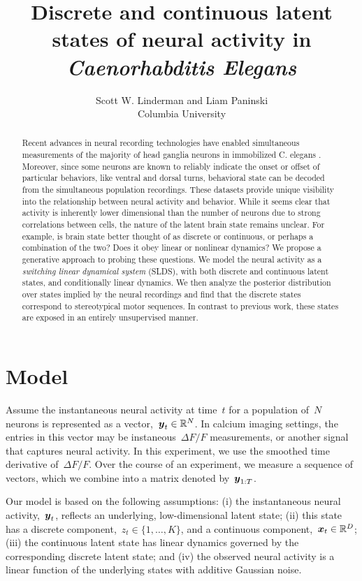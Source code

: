 \documentclass{article}
\title{Discrete and continuous latent states of neural activity in \textit{Caenorhabditis Elegans}}
\author{Scott W. Linderman 
  and
  Liam Paninski \\
  Columbia University
}
\begin{document}
\singlespacing
\maketitle

\begin{abstract}
  Recent advances in neural recording technologies have enabled
  simultaneous measurements of the majority of head ganglia neurons in
  immobilized C. elegans \cite{kato2015global}. Moreover, since some
  neurons are known to reliably indicate the onset or offset of
  particular behaviors, like ventral and dorsal turns, behavioral
  state can be decoded from the simultaneous population recordings.
  These datasets provide unique visibility into the relationship
  between neural activity and behavior.  While it seems clear that
  activity is inherently lower dimensional than the number of neurons
  due to strong correlations between cells, the nature of the latent brain state
  remains unclear. For example, is brain state better thought of as
  discrete or continuous, or perhaps a combination of the two? Does it
  obey linear or nonlinear dynamics?  We propose a generative approach
  to probing these questions. We model the neural activity as a
  \emph{switching linear dynamical system} (SLDS), with both discrete
  and continuous latent states, and conditionally linear dynamics.  We
  then analyze the posterior distribution over states implied by the
  neural recordings and find that the discrete states correspond to
  stereotypical motor sequences. In contrast to previous work, these
  states are exposed in an entirely unsupervised manner.
\end{abstract}

\onehalfspacing

\section{Model}

Assume the instantaneous neural activity at time~$t$ for a population
of~$N$ neurons is represented as a vector,~$\boldsymbol{y}_t \in \mathbb{R}^N$. In
calcium imaging settings, the entries in this vector may be
instaneous~$\Delta F/F$ measurements, or another signal that captures
neural activity. In this experiment, we use the smoothed time
derivative of~$\Delta F/F$. Over the course of an experiment, we
measure a sequence of vectors, which we combine into a matrix denoted
by~$\boldsymbol{y}_{1:T}$.

Our model is based on the following assumptions: (i) the instantaneous
neural activity,~$\boldsymbol{y}_t$, reflects an underlying, low-dimensional
latent state; (ii) this state has a discrete component,~$z_t \in \{1, \ldots, K\}$,
and a continuous component,~$\boldsymbol{x}_t \in \mathbb{R}^D$; (iii) the continuous
latent state has linear dynamics governed by the corresponding discrete
latent state; and (iv) the observed neural activity is a linear function
of the underlying states with additive Gaussian noise.  
\end{document}
